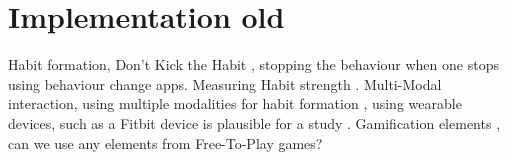 \section{Implementation old}

Habit formation, Don't Kick the Habit \cite{article_dont_kick_habit}, stopping the behaviour when one stops using behaviour change apps.\newline
Measuring Habit strength \cite{article_habit_strength} \cite{article_habit_measurement}.\newline
\newline
Multi-Modal interaction, using multiple modalities for habit formation \cite{}, using wearable devices, such as a Fitbit device is plausible for a study \cite{article_wearable_good}.\newline
\newline
Gamification elements \cite{f2p_games_how_to}, can we use any elements from Free-To-Play games?\newline
\newline

